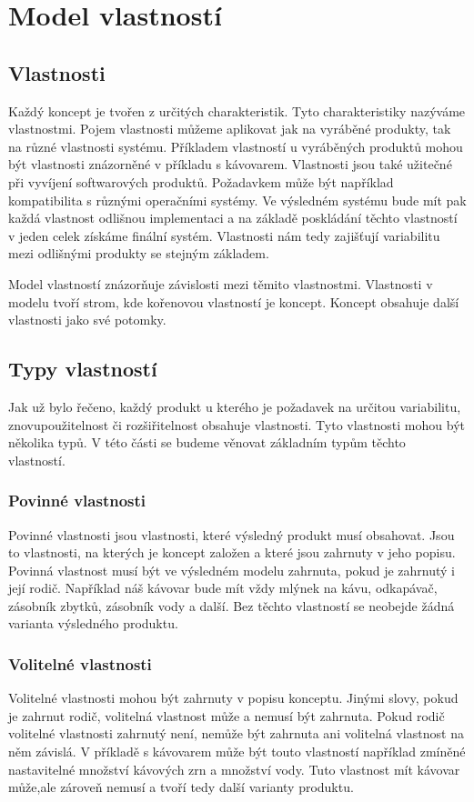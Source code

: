 \section{Model vlastností}

\subsection{Vlastnosti}

Každý koncept je tvořen z určitých charakteristik. Tyto charakteristiky nazýváme vlastnostmi. Pojem vlastnosti můžeme aplikovat jak na vyráběné produkty, tak na různé vlastnosti systému. Příkladem vlastností u vyráběných produktů mohou být vlastnosti znázorněné v příkladu s kávovarem. Vlastnosti jsou také užitečné při vyvíjení softwarových produktů. Požadavkem může být například kompatibilita s různými operačními systémy. Ve výsledném systému bude mít pak každá vlastnost odlišnou implementaci a na základě poskládání těchto vlastností v jeden celek získáme finální systém. Vlastnosti nám tedy zajišťují variabilitu mezi odlišnými produkty se stejným základem.

Model vlastností znázorňuje závislosti mezi těmito vlastnostmi. Vlastnosti v modelu tvoří strom, kde kořenovou vlastností je koncept. Koncept obsahuje další vlastnosti jako své potomky.

\subsection{Typy vlastností}

Jak už bylo řečeno, každý produkt u kterého je požadavek na určitou variabilitu, znovupoužitelnost či rozšiřitelnost obsahuje vlastnosti. Tyto vlastnosti mohou být několika typů. V této části se budeme věnovat základním typům těchto vlastností.

\subsubsection{Povinné vlastnosti}
Povinné vlastnosti jsou vlastnosti, které výsledný produkt musí obsahovat. Jsou to vlastnosti, na kterých je koncept založen a které jsou zahrnuty v jeho popisu. Povinná vlastnost musí být ve výsledném modelu zahrnuta, pokud je zahrnutý i její rodič. Například náš kávovar bude mít vždy mlýnek na kávu, odkapávač, zásobník zbytků, zásobník vody a další. Bez těchto vlastností se neobejde žádná varianta výsledného produktu. 

\subsubsection{Volitelné vlastnosti}
Volitelné vlastnosti mohou být zahrnuty v popisu konceptu. Jinými slovy, pokud je zahrnut rodič, volitelná vlastnost může a nemusí být zahrnuta. Pokud rodič volitelné vlastnosti zahrnutý není, nemůže být zahrnuta ani volitelná vlastnost na něm závislá. V příkladě s kávovarem může být touto vlastností například zmíněné nastavitelné množství kávových zrn a množství vody. Tuto vlastnost mít kávovar může,ale zároveň nemusí a tvoří tedy další varianty produktu.

